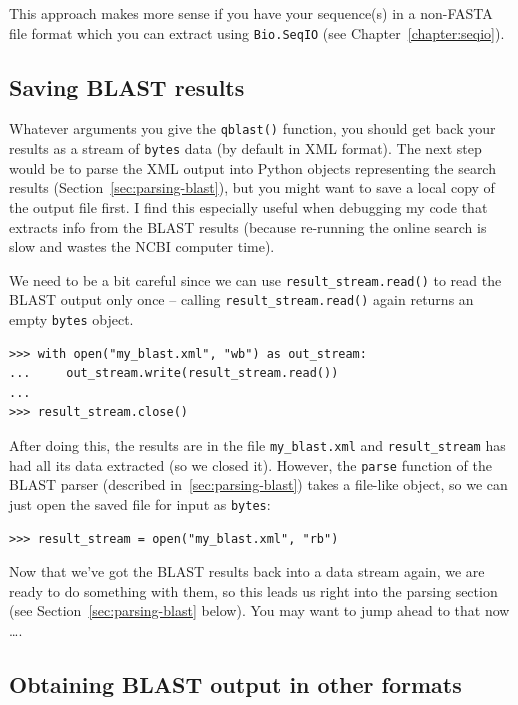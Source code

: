 This approach makes more sense if you have your sequence(s) in a
non-FASTA file format which you can extract using \verb|Bio.SeqIO|
(see Chapter~\ref{chapter:seqio}).

\subsection{Saving BLAST results}
\label{subsec:saving-blast-results}

Whatever arguments you give the \verb|qblast()| function, you should
get back your results as a stream of \verb|bytes| data
(by default in XML format).
The next step would be to parse the XML output into Python objects
representing the search results (Section~\ref{sec:parsing-blast}),
but you might want to save a local copy of the output file first.
I find this especially useful when debugging my code that extracts
info from the BLAST results (because re-running the online search
is slow and wastes the NCBI computer time).

We need to be a bit careful since we can use \verb|result_stream.read()| to
read the BLAST output only once -- calling \verb|result_stream.read()| again
returns an empty \verb|bytes| object.

\begin{verbatim}
>>> with open("my_blast.xml", "wb") as out_stream:
...     out_stream.write(result_stream.read())
...
>>> result_stream.close()
\end{verbatim}

After doing this, the results are in the file \verb|my_blast.xml| and
\verb|result_stream| has had all its data extracted (so we closed it). However,
the \verb|parse| function of the BLAST parser (described
in~\ref{sec:parsing-blast}) takes a file-like object, so
we can just open the saved file for input as \verb|bytes|:

\begin{verbatim}
>>> result_stream = open("my_blast.xml", "rb")
\end{verbatim}

Now that we've got the BLAST results back into a data stream again, we are ready
to do something with them, so this leads us right into the parsing section
(see Section~\ref{sec:parsing-blast} below). You may want to jump ahead to
that now \ldots.

\subsection{Obtaining BLAST output in other formats}
\label{subsec:blast-other-formats}

